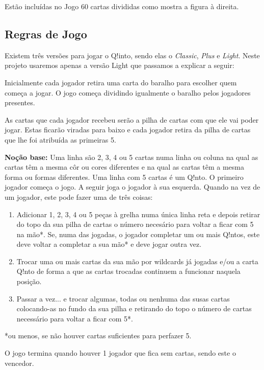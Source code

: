 \documentclass[a4paper]{article}
\begin{document}
	Estão incluídas no Jogo 60 cartas divididas como mostra a figura à direita.
	
	\subsection{Regras de Jogo}
	
	Existem três versões para jogar o Q!into, sendo elas o
	\textit{Classic},
	\textit{Plus} e
	\textit{Light}. Neste projeto usaremos apenas a versão Light que passamos a explicar a seguir:
	
	Inicialmente cada jogador retira uma carta do baralho para escolher quem começa a jogar. O jogo começa dividindo igualmente o baralho pelos jogadores presentes.
	
	As cartas que cada jogador recebeu serão a pilha de cartas com que ele vai poder jogar. Estas ficarão viradas para baixo e cada jogador retira da pilha de cartas que lhe foi atribuída as primeiras 5. 
	
	\textbf{Noção base:} Uma linha são 2, 3, 4 ou 5 cartas numa linha ou coluna na qual as cartas têm a mesma côr ou cores diferentes e na qual as cartas têm a mesma forma ou formas diferentes. Uma linha com 5 cartas é um Q!nto.
	O primeiro jogador começa o jogo. A seguir joga o jogador à sua esquerda. Quando na vez de um jogador, este pode fazer uma de três coisas:
	
	\begin{enumerate}
	\item 		Adicionar 1, 2, 3, 4 ou 5 peças à grelha numa única linha reta e depois retirar do topo da sua pilha de cartas o número necesário para voltar a ficar com 5 na mão*.
	Se, numa das jogadas, o jogador completar um ou mais Q!ntos, este deve voltar a completar a sua mão* e deve jogar outra vez.
	\item		Trocar uma ou mais cartas da sua mão por wildcards já jogadas e/ou a carta Q!nto de forma a que as cartas trocadas continuem a funcionar naquela posição.
	\item		Passar a vez... e trocar algumas, todas ou nenhuma das susas cartas colocando-as no fundo da sua pilha e retirando do topo o número de cartas necessário para voltar a ficar com 5*.
	\end{enumerate}
	
	\small
	*ou menos, se não houver cartas suficientes para perfazer 5.
	\normalsize
	
	\bigskip
	
	O jogo termina quando houver 1 jogador que fica sem cartas, sendo este o vencedor.\newline
	
\end{document}
